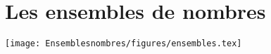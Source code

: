 
\chapter{Les ensembles de nombres}\label{ChEnsemblesnombres}

\begin{center}
   \texttt{[image: Ensemblesnombres/figures/ensembles.tex]} 
\end{center}
